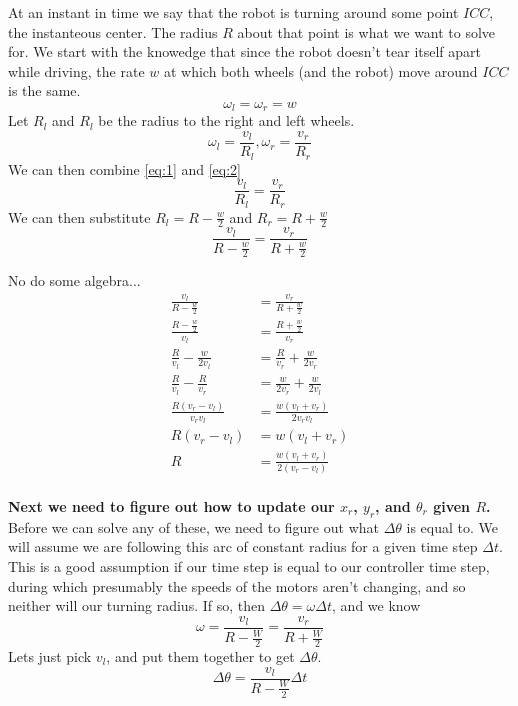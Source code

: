 \documentclass{article}
\begin{document}
At an instant in time we say that the robot is turning around some point $ICC$, the instanteous center. The radius $R$ about that point is what we want to solve for. We start with the knowedge that since the robot doesn't tear itself apart while driving, the rate $w$ at which both wheels (and the robot) move around $ICC$ is the same.
\begin{equation} \label{eq:1}
  \omega_l = \omega_r = w
\end{equation}
Let $R_l$ and $R_l$ be the radius to the right and left wheels.
\begin{equation} \label{eq:2}
  \omega_l = \frac{v_l}{R_l}, \omega_r = \frac{v_r}{R_r}
\end{equation}
We can then combine \ref{eq:1} and \ref{eq:2}
\begin{equation}
  \frac{v_l}{R_l} = \frac{v_r}{R_r}
\end{equation}
We can then substitute $R_l = R - \frac{w}{2}$ and $R_r = R + \frac{w}{2}$
\begin{equation}
  \frac{v_l}{R-\frac{w}{2}} = \frac{v_r}{R + \frac{w}{2}}
\end{equation}

No do some algebra...
\begin{align*}
  \frac{v_l}{R-\frac{w}{2}} &= \frac{v_r}{R + \frac{w}{2}} \\[1em]
  \frac{R-\frac{w}{2}}{v_l} &= \frac{R + \frac{w}{2}}{v_r} \\[1em]
  \frac{R}{v_l}-\frac{w}{2v_l} &= \frac{R}{v_r} + \frac{w}{2v_r} \\[1em]
  \frac{R}{v_l}-\frac{R}{v_r} &= \frac{w}{2v_r}+\frac{w}{2v_l} \\[1em]
  \frac{R(v_r-v_l)}{v_rv_l} &= \frac{w(v_l+v_r)}{2v_rv_l} \\[1em]
  R(v_r-v_l) &= w(v_l+v_r) \\[1em]
  R &= \frac{w(v_l+v_r)}{2(v_r-v_l)} \\[1em]
\end{align*}

\textbf{Next we need to figure out how to update our $x_r$, $y_r$, and $\theta_r$ given $R$.} \\

Before we can solve any of these, we need to figure out what $\Delta\theta$ is equal to. We will assume we are following this arc of constant radius for a given time step $\Delta t$. This is a good assumption if our time step is equal to our controller time step, during which presumably the speeds of the motors aren't changing, and so neither will our turning radius. If so, then $\Delta\theta = \omega\Delta t$, and we know
$$\omega=\dfrac{v_l}{R-\frac{W}{2}} = \dfrac{v_r}{R+\frac{W}{2}}$$
Lets just pick $v_l$, and put them together to get $\Delta\theta$.
$$\Delta\theta = \dfrac{v_l}{R-\frac{W}{2}}\Delta t$$
\end{document}
